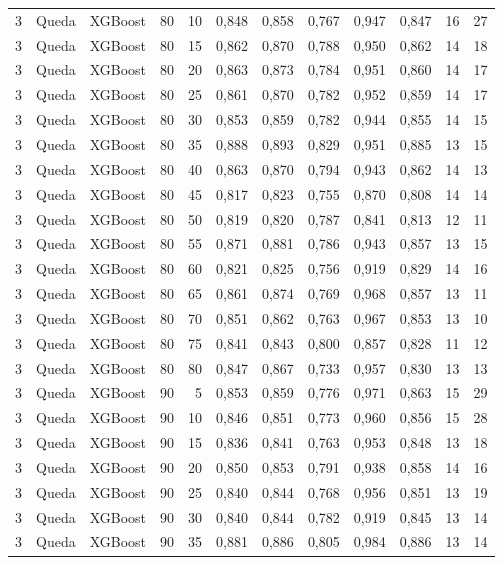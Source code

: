\begin{longtable}{@{}rllrrrrrrrrr@{}}
3 & Queda & XGBoost & 80 & 10 & 0,848 & 0,858 & 0,767 & 0,947 & 0,847 & 16 & 27 \\
3 & Queda & XGBoost & 80 & 15 & 0,862 & 0,870 & 0,788 & 0,950 & 0,862 & 14 & 18 \\
3 & Queda & XGBoost & 80 & 20 & 0,863 & 0,873 & 0,784 & 0,951 & 0,860 & 14 & 17 \\
3 & Queda & XGBoost & 80 & 25 & 0,861 & 0,870 & 0,782 & 0,952 & 0,859 & 14 & 17 \\
3 & Queda & XGBoost & 80 & 30 & 0,853 & 0,859 & 0,782 & 0,944 & 0,855 & 14 & 15 \\
3 & Queda & XGBoost & 80 & 35 & 0,888 & 0,893 & 0,829 & 0,951 & 0,885 & 13 & 15 \\
3 & Queda & XGBoost & 80 & 40 & 0,863 & 0,870 & 0,794 & 0,943 & 0,862 & 14 & 13 \\
3 & Queda & XGBoost & 80 & 45 & 0,817 & 0,823 & 0,755 & 0,870 & 0,808 & 14 & 14 \\
3 & Queda & XGBoost & 80 & 50 & 0,819 & 0,820 & 0,787 & 0,841 & 0,813 & 12 & 11 \\
3 & Queda & XGBoost & 80 & 55 & 0,871 & 0,881 & 0,786 & 0,943 & 0,857 & 13 & 15 \\
3 & Queda & XGBoost & 80 & 60 & 0,821 & 0,825 & 0,756 & 0,919 & 0,829 & 14 & 16 \\
3 & Queda & XGBoost & 80 & 65 & 0,861 & 0,874 & 0,769 & 0,968 & 0,857 & 13 & 11 \\
3 & Queda & XGBoost & 80 & 70 & 0,851 & 0,862 & 0,763 & 0,967 & 0,853 & 13 & 10 \\
3 & Queda & XGBoost & 80 & 75 & 0,841 & 0,843 & 0,800 & 0,857 & 0,828 & 11 & 12 \\
3 & Queda & XGBoost & 80 & 80 & 0,847 & 0,867 & 0,733 & 0,957 & 0,830 & 13 & 13 \\
3 & Queda & XGBoost & 90 & 5 & 0,853 & 0,859 & 0,776 & 0,971 & 0,863 & 15 & 29 \\
3 & Queda & XGBoost & 90 & 10 & 0,846 & 0,851 & 0,773 & 0,960 & 0,856 & 15 & 28 \\
3 & Queda & XGBoost & 90 & 15 & 0,836 & 0,841 & 0,763 & 0,953 & 0,848 & 13 & 18 \\
3 & Queda & XGBoost & 90 & 20 & 0,850 & 0,853 & 0,791 & 0,938 & 0,858 & 14 & 16 \\
3 & Queda & XGBoost & 90 & 25 & 0,840 & 0,844 & 0,768 & 0,956 & 0,851 & 13 & 19 \\
3 & Queda & XGBoost & 90 & 30 & 0,840 & 0,844 & 0,782 & 0,919 & 0,845 & 13 & 14 \\
3 & Queda & XGBoost & 90 & 35 & 0,881 & 0,886 & 0,805 & 0,984 & 0,886 & 13 & 14 \\

\end{longtable}
